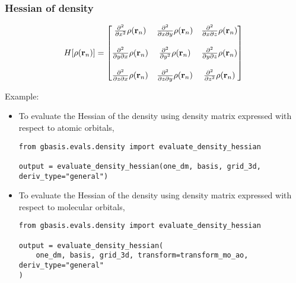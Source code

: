 \documentclass[letterpaper]{article}
\begin{document}
\subsubsection{Hessian of density}
\begin{equation}
	H[\rho(\mathbf{r}_n)]
	=
	\begin{bmatrix}
		\frac{\partial^2}{\partial x^2} \rho(\mathbf{r}_n) &
		\frac{\partial^2}{\partial x \partial y} \rho(\mathbf{r}_n) &
		\frac{\partial^2}{\partial x \partial z} \rho(\mathbf{r}_n)\\\\
		\frac{\partial^2}{\partial y \partial x} \rho(\mathbf{r}_n) &
		\frac{\partial^2}{\partial y^2} \rho(\mathbf{r}_n)&
		\frac{\partial^2}{\partial y \partial z} \rho(\mathbf{r}_n)\\\\
		\frac{\partial^2}{\partial z \partial x} \rho(\mathbf{r}_n) &
		\frac{\partial^2}{\partial z \partial y} \rho(\mathbf{r}_n)&
		\frac{\partial^2}{\partial z^2} \rho(\mathbf{r}_n)\\
	\end{bmatrix}\\
\end{equation}

Example:
\begin{itemize}
\item To evaluate the Hessian of the density using density matrix expressed
  with respect to atomic orbitals,
  \begin{lstlisting}[xleftmargin=-25pt]
from gbasis.evals.density import evaluate_density_hessian

output = evaluate_density_hessian(one_dm, basis, grid_3d, deriv_type="general")
\end{lstlisting}
\item To evaluate the Hessian of the density using density matrix expressed
  with respect to molecular orbitals,
  \begin{lstlisting}[xleftmargin=-25pt]
from gbasis.evals.density import evaluate_density_hessian

output = evaluate_density_hessian(
    one_dm, basis, grid_3d, transform=transform_mo_ao, deriv_type="general"
)
\end{lstlisting}
\end{itemize}
\end{document}
